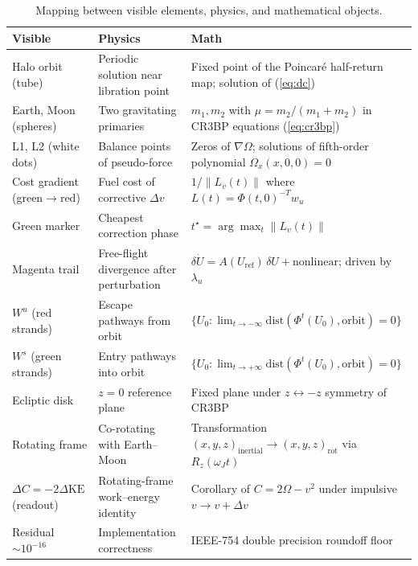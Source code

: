 \documentclass[11pt,a4paper]{article}
\begin{document}
\begin{table}[H]
\centering
\small
\caption{Mapping between visible elements, physics, and mathematical objects.}
\begin{tabularx}{\textwidth}{@{}l l X@{}}
\toprule
\textbf{Visible} & \textbf{Physics} & \textbf{Math} \\
\midrule
Halo orbit (tube)            & Periodic solution near libration point & Fixed point of the Poincaré half-return map; solution of (\ref{eq:dc}) \\
Earth, Moon (spheres)        & Two gravitating primaries               & $m_1, m_2$ with $\mu = m_2/(m_1+m_2)$ in CR3BP equations (\ref{eq:cr3bp}) \\
L1, L2 (white dots)           & Balance points of pseudo-force          & Zeros of $\nabla\Omega$; solutions of fifth-order polynomial $\Omega_x(x,0,0) = 0$ \\
Cost gradient (green$\to$red) & Fuel cost of corrective $\Delta v$      & $1/\|L_v(t)\|$ where $L(t) = \Phi(t,0)^{-T} w_u$ \\
Green marker                  & Cheapest correction phase               & $t^\star = \arg\max_t \|L_v(t)\|$ \\
Magenta trail                 & Free-flight divergence after perturbation & $\delta \dot U = A(U_{\text{ref}})\,\delta U + \text{nonlinear}$; driven by $\lambda_u$ \\
$W^u$ (red strands)           & Escape pathways from orbit              & $\{U_0 : \lim_{t\to-\infty} \mathrm{dist}(\Phi^t(U_0), \text{orbit}) = 0\}$ \\
$W^s$ (green strands)         & Entry pathways into orbit               & $\{U_0 : \lim_{t\to+\infty} \mathrm{dist}(\Phi^t(U_0), \text{orbit}) = 0\}$ \\
Ecliptic disk                 & $z = 0$ reference plane                  & Fixed plane under $z \leftrightarrow -z$ symmetry of CR3BP \\
Rotating frame                & Co-rotating with Earth--Moon           & Transformation $(x,y,z)_{\text{inertial}} \to (x,y,z)_{\text{rot}}$ via $R_z(\omega_J t)$ \\
$\Delta C = -2\Delta\mathrm{KE}$ (readout) & Rotating-frame work--energy identity & Corollary of $C = 2\Omega - v^2$ under impulsive $v \to v + \Delta v$ \\
Residual $\sim 10^{-16}$      & Implementation correctness              & IEEE-754 double precision roundoff floor \\
\bottomrule
\end{tabularx}
\end{table}
\end{document}

